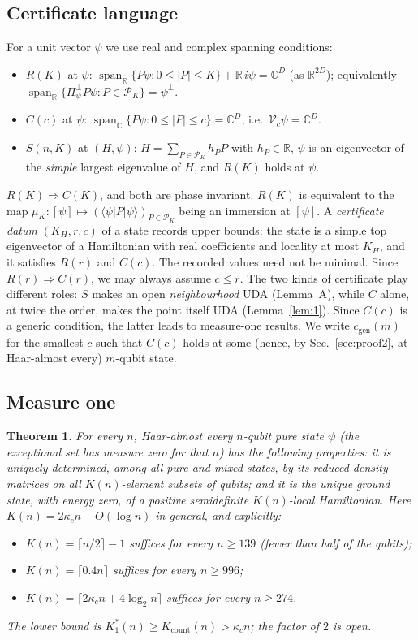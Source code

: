 \documentclass[aps,pra,onecolumn,superscriptaddress,nofootinbib,longbibliography,10pt]{revtex4-2}
\newtheorem{theorem}{Theorem}
\theoremstyle{definition}
\newcommand{\CC}{\mathbb C}
\newcommand{\RR}{\mathbb R}
\newcommand{\spanR}{\operatorname{span}_{\RR}}
\newcommand{\spanC}{\operatorname{span}_{\CC}}
\newcommand{\Pperp}{\Pi^{\perp}_{\psi}}
\newcommand{\kc}{\kappa_c}
\newcommand{\Ko}{K^{*}_{1}}
\newcommand{\Kc}{K_{\mathrm{count}}}
\newcommand{\cgen}{c_{\mathrm{gen}}}
\begin{document}
\subsection{Certificate language}
For a unit vector $\psi$ we use real and complex spanning conditions:
\begin{itemize}
\item $R(K)$ at $\psi$: $\spanR\{P\psi:0\le|P|\le K\}+\RR\,i\psi=\CC^D$ (as $\RR^{2D}$); equivalently $\spanR\{\Pperp P\psi:P\in\mathcal P_K\}=\psi^\perp$.
\item $C(c)$ at $\psi$: $\spanC\{P\psi:0\le|P|\le c\}=\CC^D$, i.e.\ $\mathcal V_c\psi=\CC^D$.
\item $S(n,K)$ at $(H,\psi)$: $H=\sum_{P\in\mathcal P_K}h_PP$ with $h_P\in\RR$, $\psi$ is an eigenvector of the \emph{simple} largest eigenvalue of $H$, and $R(K)$ holds at $\psi$.
\end{itemize}
$R(K)\Rightarrow C(K)$, and both are phase invariant. $R(K)$ is equivalent to the map $\mu_K:[\psi]\mapsto(\langle\psi|P|\psi\rangle)_{P\in\mathcal P_K}$ being an immersion at $[\psi]$. A \emph{certificate datum} $(K_H,r,c)$ of a state records upper bounds: the state is a simple top eigenvector of a Hamiltonian with real coefficients and locality at most $K_H$, and it satisfies $R(r)$ and $C(c)$. The recorded values need not be minimal. Since $R(r)\Rightarrow C(r)$, we may always assume $c\le r$. The two kinds of certificate play different roles: $S$ makes an open \emph{neighbourhood} UDA (Lemma~A), while $C$ alone, at twice the order, makes the point itself UDA (Lemma~\ref{lem:1}). Since $C(c)$ is a generic condition, the latter leads to measure-one results. We write $\cgen(m)$ for the smallest $c$ such that $C(c)$ holds at some (hence, by Sec.~\ref{sec:proof2}, at Haar-almost every) $m$-qubit state.

\subsection{Measure one}
\begin{theorem}\label{thm:main}
For every $n$, Haar-almost every $n$-qubit pure state $\psi$ (the exceptional set has measure zero for that $n$) has the following properties: it is uniquely determined, among all pure and mixed states, by its reduced density matrices on all $K(n)$-element subsets of qubits; and it is the unique ground state, with energy zero, of a positive semidefinite $K(n)$-local Hamiltonian. Here $K(n)=2\kc n+O(\log n)$ in general, and explicitly:
\begin{itemize}
\item $K(n)=\lceil n/2\rceil-1$ suffices for every $n\ge139$ (fewer than half of the qubits);
\item $K(n)=\lceil0.4n\rceil$ suffices for every $n\ge996$;
\item $K(n)=\lceil2\kc n+4\log_2n\rceil$ suffices for every $n\ge274$.
\end{itemize}
The lower bound is $\Ko(n)\ge\Kc(n)>\kc n$; the factor of $2$ is open.
\end{theorem}
\end{document}
